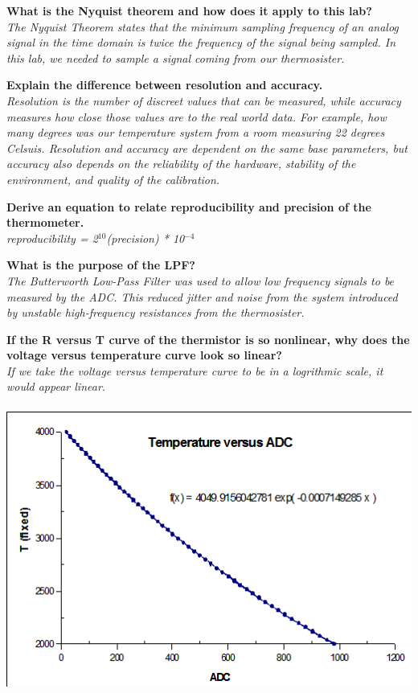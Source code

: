 \documentclass[twoside]{article}
\begin{document}
\begin{pset}
  \textbf{What is the Nyquist theorem and how does it apply to this lab?}\\
  	\emph{The Nyquist Theorem states that the minimum sampling frequency of an analog signal in the time domain is twice the frequency of the signal being sampled. In this lab, we needed to sample a signal coming from our thermosister.}
    
  \textbf{Explain the difference between resolution and accuracy.}\\
  \emph{Resolution is the number of discreet values that can be measured, while accuracy measures how close those values are to the real world data. For example, how many degrees was our temperature system from a room measuring 22 degrees Celsuis. Resolution and accuracy are dependent on the same base parameters, but accuracy also depends on the reliability of the hardware, stability of the environment, and quality of the calibration.}
  
  \textbf{Derive an equation to relate reproducibility and precision of the thermometer.}\\
  \emph{reproducibility = 2$^{10}$(precision) * 10$^{-4}$}
  
  \textbf{What is the purpose of the LPF?}\\
  \emph{The Butterworth Low-Pass Filter was used to allow low frequency signals to be measured by the ADC. This reduced jitter and noise from the system introduced by unstable high-frequency resistances from the thermosister.}
  
  \textbf{If the R versus T curve of the thermistor is so nonlinear, why does the voltage versus temperature curve look so linear?}\\
  \emph{If we take the voltage versus temperature curve to be in a logrithmic scale, it would appear linear.}\\
  \includegraphics[height = 4in, width=\textwidth]{T_ADC}
  

\end{pset}
\end{document}
